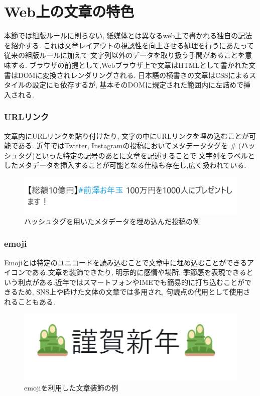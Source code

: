 \section {Web上の文章の特色}
本節では組版ルールに則らない, 紙媒体とは異なるweb上で書かれる独自の記法を紹介する.
これは文章レイアウトの視認性を向上させる処理を行うにあたって従来の組版ルールに加えて
文字列以外のデータを取り扱う手間があることを意味する.
ブラウザの前提として,Webブラウザ上で文章はHTMLとして書かれた文書はDOMに変換されレンダリングされる.
日本語の横書きの文章はCSSによるスタイルの設定にも依存するが, 基本そのDOMに規定された範囲内に左詰めで挿入される.

\subsubsection{URLリンク}
文章内にURLリンクを貼り付けたり, 文字の中にURLリンクを埋め込むことが可能である.
近年ではTwitter, Instagramの投稿においてメタデータタグを \# (ハッシュタグ)といった特定の記号のあとに文章を記述することで
文字列をラベルとしたメタデータを挿入することが可能となる仕様も存在し,広く扱われている.
\begin{figure}[H]
    \centering
    \label{fig:image8}
    \includegraphics[width=0.6\columnwidth]{image/02/img_3.png}
    \caption[ハッシュタグを用いたメタデータを埋め込んだ投稿の例]{ハッシュタグを用いたメタデータを埋め込んだ投稿の例\footnotemark[1]}
\end{figure}


\subsubsection{emoji}
Emojiとは特定のユニコードを読み込むことで文章中に埋め込むことができるアイコンである.文章を装飾できたり, 
明示的に感情や場所, 季節感を表現できるという利点がある.近年ではスマートフォンやIMEでも簡易的に打ち込むことができるため, 
SNS上や砕けた文体の文章では多用され, 句読点の代用として使用されることもある.
\begin{figure}[H]
    \centering
    \label{fig:image8}
    \includegraphics[width=0.6\columnwidth]{image/02/img_1.png}
    \caption[emojiを利用した文章装飾の例]{emojiを利用した文章装飾の例}
\end{figure}


